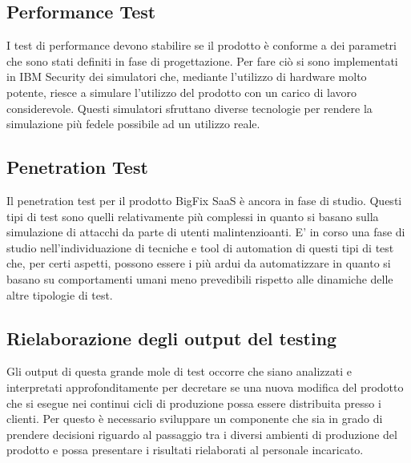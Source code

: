 \subsection{Performance Test}
I test di performance devono stabilire se il prodotto è conforme a dei parametri che sono stati definiti in fase di progettazione. Per fare ciò si sono implementati in IBM Security dei simulatori che, mediante l'utilizzo di hardware molto potente, riesce a simulare l'utilizzo del prodotto con un carico di lavoro considerevole. Questi simulatori sfruttano diverse tecnologie per rendere la simulazione più fedele possibile ad un utilizzo reale.

\subsection{Penetration Test}
Il penetration test per il prodotto BigFix SaaS è ancora in fase di studio. Questi tipi di test sono quelli relativamente più complessi in quanto si basano sulla simulazione di attacchi da parte di utenti malintenzioanti. E' in corso una fase di studio nell'individuazione di tecniche e tool di automation di questi tipi di test che, per certi aspetti, possono essere i più ardui da automatizzare in quanto si basano su comportamenti umani meno prevedibili rispetto alle dinamiche delle altre tipologie di test.

\subsection{Rielaborazione degli output del testing}
Gli output di questa grande mole di test occorre che siano analizzati e interpretati approfonditamente per decretare se una nuova modifica del prodotto che si esegue nei continui cicli di produzione possa essere distribuita presso i clienti. Per questo è necessario sviluppare un componente che sia in grado di prendere decisioni riguardo al passaggio tra i diversi ambienti di produzione del prodotto e possa presentare i risultati rielaborati al personale incaricato.

